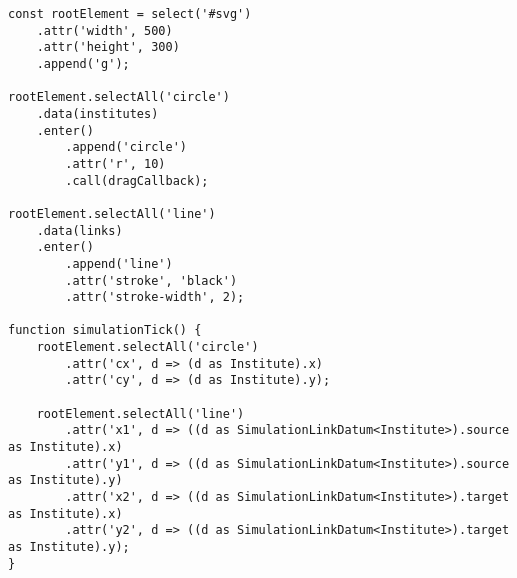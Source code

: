 \begin{lstlisting}
const rootElement = select('#svg')
    .attr('width', 500)
    .attr('height', 300)
    .append('g');

rootElement.selectAll('circle')
    .data(institutes)
    .enter()
        .append('circle')
        .attr('r', 10)
        .call(dragCallback);

rootElement.selectAll('line')
    .data(links)
    .enter()
        .append('line')
        .attr('stroke', 'black')
        .attr('stroke-width', 2);

function simulationTick() {
    rootElement.selectAll('circle')
        .attr('cx', d => (d as Institute).x)
        .attr('cy', d => (d as Institute).y);

    rootElement.selectAll('line')
        .attr('x1', d => ((d as SimulationLinkDatum<Institute>).source as Institute).x)
        .attr('y1', d => ((d as SimulationLinkDatum<Institute>).source as Institute).y)
        .attr('x2', d => ((d as SimulationLinkDatum<Institute>).target as Institute).x)
        .attr('y2', d => ((d as SimulationLinkDatum<Institute>).target as Institute).y);
}
\end{lstlisting}

